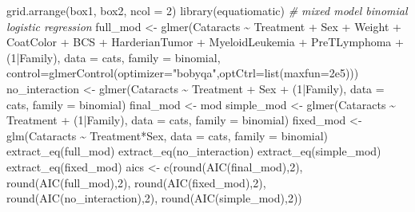 \documentclass[12pt]{article}
\newenvironment{Shaded}{\begin{snugshade}}{\end{snugshade}}
\newcommand{\AttributeTok}[1]{\textcolor[rgb]{0.77,0.63,0.00}{#1}}
\newcommand{\CommentTok}[1]{\textcolor[rgb]{0.56,0.35,0.01}{\textit{#1}}}
\newcommand{\DecValTok}[1]{\textcolor[rgb]{0.00,0.00,0.81}{#1}}
\newcommand{\FloatTok}[1]{\textcolor[rgb]{0.00,0.00,0.81}{#1}}
\newcommand{\FunctionTok}[1]{\textcolor[rgb]{0.00,0.00,0.00}{#1}}
\newcommand{\NormalTok}[1]{#1}
\newcommand{\OtherTok}[1]{\textcolor[rgb]{0.56,0.35,0.01}{#1}}
\newcommand{\SpecialCharTok}[1]{\textcolor[rgb]{0.00,0.00,0.00}{#1}}
\newcommand{\StringTok}[1]{\textcolor[rgb]{0.31,0.60,0.02}{#1}}
\begin{document}
\begin{Shaded}
\begin{Highlighting}[]
\FunctionTok{grid.arrange}\NormalTok{(box1, box2, }\AttributeTok{ncol =} \DecValTok{2}\NormalTok{)}
\FunctionTok{library}\NormalTok{(equatiomatic)}
\CommentTok{\# mixed model binomial logistic regression }
\NormalTok{full\_mod }\OtherTok{\textless{}{-}} \FunctionTok{glmer}\NormalTok{(Cataracts }\SpecialCharTok{\textasciitilde{}}\NormalTok{ Treatment }\SpecialCharTok{+}\NormalTok{ Sex }\SpecialCharTok{+}\NormalTok{ Weight }\SpecialCharTok{+}\NormalTok{ CoatColor }\SpecialCharTok{+}\NormalTok{ BCS }\SpecialCharTok{+}\NormalTok{ HarderianTumor }\SpecialCharTok{+}
\NormalTok{                    MyeloidLeukemia }\SpecialCharTok{+}\NormalTok{ PreTLymphoma }\SpecialCharTok{+}\NormalTok{ (}\DecValTok{1}\SpecialCharTok{|}\NormalTok{Family), }\AttributeTok{data =}\NormalTok{ cats, }\AttributeTok{family =}\NormalTok{ binomial,}
                  \AttributeTok{control=}\FunctionTok{glmerControl}\NormalTok{(}\AttributeTok{optimizer=}\StringTok{"bobyqa"}\NormalTok{,}\AttributeTok{optCtrl=}\FunctionTok{list}\NormalTok{(}\AttributeTok{maxfun=}\FloatTok{2e5}\NormalTok{)))}
\NormalTok{no\_interaction }\OtherTok{\textless{}{-}} \FunctionTok{glmer}\NormalTok{(Cataracts }\SpecialCharTok{\textasciitilde{}}\NormalTok{ Treatment }\SpecialCharTok{+}\NormalTok{ Sex }\SpecialCharTok{+}\NormalTok{ (}\DecValTok{1}\SpecialCharTok{|}\NormalTok{Family), }\AttributeTok{data =}\NormalTok{ cats, }\AttributeTok{family =}\NormalTok{ binomial)}
\NormalTok{final\_mod }\OtherTok{\textless{}{-}}\NormalTok{ mod}
\NormalTok{simple\_mod }\OtherTok{\textless{}{-}} \FunctionTok{glmer}\NormalTok{(Cataracts }\SpecialCharTok{\textasciitilde{}}\NormalTok{ Treatment }\SpecialCharTok{+}\NormalTok{ (}\DecValTok{1}\SpecialCharTok{|}\NormalTok{Family), }\AttributeTok{data =}\NormalTok{ cats, }\AttributeTok{family =}\NormalTok{ binomial)}
\NormalTok{fixed\_mod }\OtherTok{\textless{}{-}} \FunctionTok{glm}\NormalTok{(Cataracts }\SpecialCharTok{\textasciitilde{}}\NormalTok{ Treatment}\SpecialCharTok{*}\NormalTok{Sex, }\AttributeTok{data =}\NormalTok{ cats, }\AttributeTok{family =}\NormalTok{ binomial)}
\FunctionTok{extract\_eq}\NormalTok{(full\_mod)}
\FunctionTok{extract\_eq}\NormalTok{(no\_interaction)}
\FunctionTok{extract\_eq}\NormalTok{(simple\_mod)}
\FunctionTok{extract\_eq}\NormalTok{(fixed\_mod)}
\NormalTok{aics }\OtherTok{\textless{}{-}} \FunctionTok{c}\NormalTok{(}\FunctionTok{round}\NormalTok{(}\FunctionTok{AIC}\NormalTok{(final\_mod),}\DecValTok{2}\NormalTok{), }\FunctionTok{round}\NormalTok{(}\FunctionTok{AIC}\NormalTok{(full\_mod),}\DecValTok{2}\NormalTok{), }\FunctionTok{round}\NormalTok{(}\FunctionTok{AIC}\NormalTok{(fixed\_mod),}\DecValTok{2}\NormalTok{), }\FunctionTok{round}\NormalTok{(}\FunctionTok{AIC}\NormalTok{(no\_interaction),}\DecValTok{2}\NormalTok{), }\FunctionTok{round}\NormalTok{(}\FunctionTok{AIC}\NormalTok{(simple\_mod),}\DecValTok{2}\NormalTok{))}

\end{Highlighting}
\end{Shaded}
\end{document}
